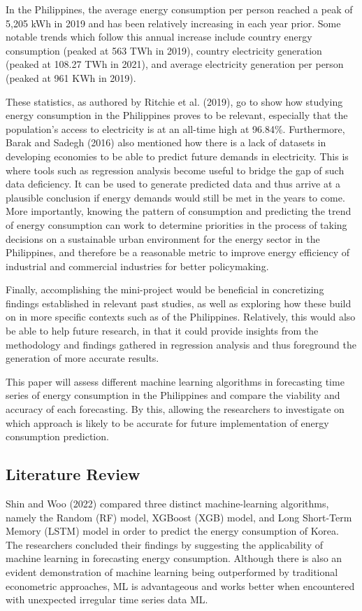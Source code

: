 \documentclass[runningheads]{llncs}
\begin{document}
In the Philippines, the average energy consumption per person reached a peak of 5,205 kWh in 2019 and has been relatively increasing in each year prior. Some notable trends which follow this annual increase include country energy consumption (peaked at 563 TWh in 2019), country electricity generation (peaked at 108.27 TWh in 2021), and average electricity generation per person (peaked at 961 KWh in 2019). 

These statistics, as authored by Ritchie et al. (2019), go to show how studying energy consumption in the Philippines proves to be relevant, especially that the population’s access to electricity is at an all-time high at 96.84\%. Furthermore, Barak and Sadegh (2016) also mentioned how there is a lack of datasets in developing economies to be able to predict future demands in electricity. This is where tools such as regression analysis become useful to bridge the gap of such data deficiency. It can be used to generate predicted data and thus arrive at a plausible conclusion if energy demands would still be met in the years to come. More importantly, knowing the pattern of consumption and predicting the trend of energy consumption can work to determine priorities in the process of taking decisions on a sustainable urban environment for the energy sector in the Philippines, and therefore be a reasonable metric to improve energy efficiency of industrial and commercial industries for better policymaking. 

Finally, accomplishing the mini-project would be beneficial in concretizing findings established in relevant past studies, as well as exploring how these build on in more specific contexts such as of the Philippines. Relatively, this would also be able to help future research, in that it could provide insights from the methodology and findings gathered in regression analysis and thus foreground the generation of more accurate results.

This paper will assess different machine learning algorithms in forecasting time series of energy consumption in the Philippines and compare the viability and accuracy of each forecasting. By this, allowing the researchers to investigate on which approach is likely to be accurate for future implementation of energy consumption prediction.

\subsection{Literature Review}
Shin and Woo (2022) compared three distinct machine-learning algorithms, namely the Random (RF) model, XGBoost (XGB) model, and Long Short-Term Memory (LSTM) model in order to predict the energy consumption of Korea. The researchers concluded their findings by suggesting the applicability of machine learning in forecasting energy consumption. Although there is also an evident demonstration of machine learning being outperformed by traditional econometric approaches,  ML is advantageous and works better when encountered with unexpected irregular time series data ML. 
\end{document}

